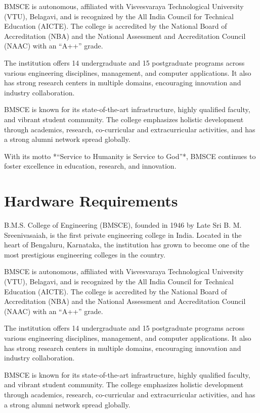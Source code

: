 \documentclass[12pt,a4paper]{report}
\begin{document}
BMSCE is autonomous, affiliated with Visvesvaraya Technological University (VTU), Belagavi, 
and is recognized by the All India Council for Technical Education (AICTE). The college is 
accredited by the National Board of Accreditation (NBA) and the National Assessment and 
Accreditation Council (NAAC) with an “A++” grade.

The institution offers 14 undergraduate and 15 postgraduate programs across various 
engineering disciplines, management, and computer applications. It also has strong research 
centers in multiple domains, encouraging innovation and industry collaboration. 

BMSCE is known for its state-of-the-art infrastructure, highly qualified faculty, and vibrant 
student community. The college emphasizes holistic development through academics, research, 
co-curricular and extracurricular activities, and has a strong alumni network spread 
globally. 

With its motto *“Service to Humanity is Service to God”*, BMSCE continues to foster 
excellence in education, research, and innovation.
\section{Hardware Requirements }
B.M.S. College of Engineering (BMSCE), founded in 1946 by Late Sri B. M. Sreenivasaiah, 
is the first private engineering college in India. Located in the heart of Bengaluru, 
Karnataka, the institution has grown to become one of the most prestigious engineering 
colleges in the country. 

BMSCE is autonomous, affiliated with Visvesvaraya Technological University (VTU), Belagavi, 
and is recognized by the All India Council for Technical Education (AICTE). The college is 
accredited by the National Board of Accreditation (NBA) and the National Assessment and 
Accreditation Council (NAAC) with an “A++” grade.

The institution offers 14 undergraduate and 15 postgraduate programs across various 
engineering disciplines, management, and computer applications. It also has strong research 
centers in multiple domains, encouraging innovation and industry collaboration. 

BMSCE is known for its state-of-the-art infrastructure, highly qualified faculty, and vibrant 
student community. The college emphasizes holistic development through academics, research, 
co-curricular and extracurricular activities, and has a strong alumni network spread 
globally. 
\end{document}
